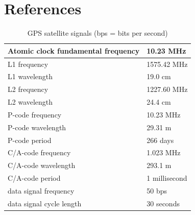 \section{References}
  


\clearpage
\begin{table}[h!]
	\begin{center}
		\caption{GPS satellite signals (bps = bits per second) \cite[]{seeber2003chpt2}}
		\label{tab:chpt2_table1}
		\begin{tabular}{ll}
			\midrule
			Atomic clock fundamental frequency & 10.23 MHz \\
			\midrule
			L1 frequency & 1575.42 MHz\\
			L1 wavelength & 19.0 cm\\
			L2 frequency & 1227.60 MHz\\
			L2 wavelength & 24.4 cm\\
			\midrule
			P-code frequency & 10.23 MHz\\
			P-code wavelength & 29.31 m\\
			P-code period & 266 days\\
			C/A-code frequency & 1.023 MHz\\
			C/A-code wavelength & 293.1 m\\
			C/A-code period & 1 millisecond\\
			\midrule
			data signal frequency & 50 bps\\
		    data signal cycle length & 30 seconds\\			
			\midrule
		\end{tabular}
	\end{center}
\end{table}
 
